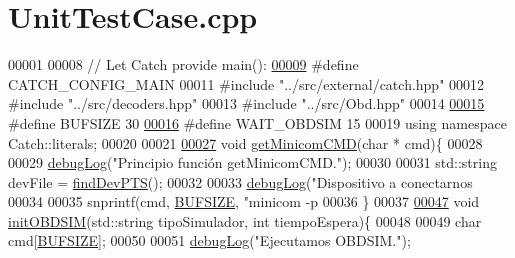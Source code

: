 \hypertarget{UnitTestCase_8cpp_source}{}\section{Unit\+Test\+Case.\+cpp}
\label{UnitTestCase_8cpp_source}

\begin{DoxyCode}
00001 
00008 \textcolor{comment}{// Let Catch provide main():}
\hyperlink{UnitTestCase_8cpp_a656eb5868e824d59f489f910db438420}{00009} \textcolor{preprocessor}{#define CATCH\_CONFIG\_MAIN }
00011 \textcolor{preprocessor}{#include "../src/external/catch.hpp"}
00012 \textcolor{preprocessor}{#include "../src/decoders.hpp"}
00013 \textcolor{preprocessor}{#include "../src/Obd.hpp"}
00014 
\hyperlink{UnitTestCase_8cpp_aeca034f67218340ecb2261a22c2f3dcd}{00015} \textcolor{preprocessor}{#define BUFSIZE 30 }
\hyperlink{UnitTestCase_8cpp_a39116fcd47bddafea0487b3f674b9609}{00016} \textcolor{preprocessor}{#define WAIT\_OBDSIM 15 }
00019 \textcolor{preprocessor}{using namespace Catch::literals;}
00020 
00021 
\hyperlink{UnitTestCase_8cpp_ae9f15809d7998bb4a7404d34bb87a5e3}{00027} \textcolor{keywordtype}{void} \hyperlink{UnitTestCase_8cpp_ae9f15809d7998bb4a7404d34bb87a5e3}{getMinicomCMD}(\textcolor{keywordtype}{char} * cmd)\{
00028 
00029     \hyperlink{debug_8hpp_a55f41cf7b0585224496de3d7adbc101c}{debugLog}(\textcolor{stringliteral}{"Principio función getMinicomCMD."});
00030 
00031     std::string devFile = \hyperlink{MockSocket_8cpp_a33fe4c99996c8de03c33962525663851}{findDevPTS}();
00032 
00033     \hyperlink{debug_8hpp_a55f41cf7b0585224496de3d7adbc101c}{debugLog}(\textcolor{stringliteral}{"Dispositivo a conectarnos %
00034 
00035     snprintf(cmd, \hyperlink{UnitTestCase_8cpp_aeca034f67218340ecb2261a22c2f3dcd}{BUFSIZE}, \textcolor{stringliteral}{"minicom -p %
00036 \}
00037 
\hyperlink{UnitTestCase_8cpp_a15137ff9ba6032f171a43694f159ada6}{00047} \textcolor{keywordtype}{void} \hyperlink{UnitTestCase_8cpp_a15137ff9ba6032f171a43694f159ada6}{initOBDSIM}(std::string tipoSimulador, \textcolor{keywordtype}{int} tiempoEspera)\{
00048 
00049     \textcolor{keywordtype}{char} cmd[\hyperlink{UnitTestCase_8cpp_aeca034f67218340ecb2261a22c2f3dcd}{BUFSIZE}];
00050 
00051     \hyperlink{debug_8hpp_a55f41cf7b0585224496de3d7adbc101c}{debugLog}(\textcolor{stringliteral}{"Ejecutamos OBDSIM."});
}}
\end{DoxyCode}
